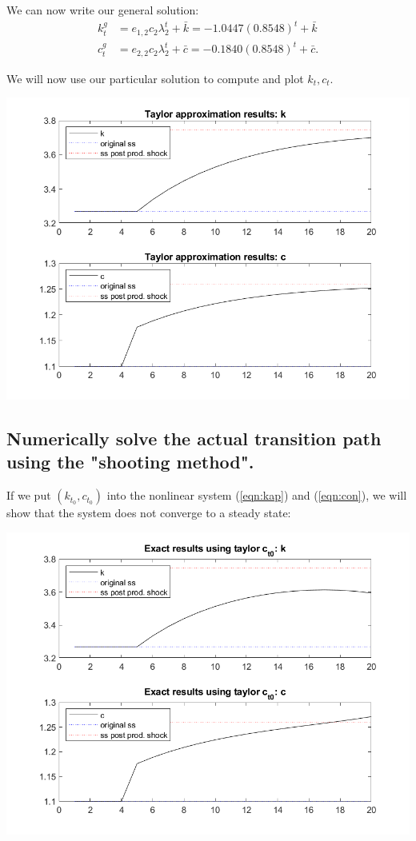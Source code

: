 \documentclass[11pt]{article} %
\begin{document}
We can now write our general solution:
\begin{align*}
k_{t}^{g} &= e_{1,2} c_2 \lambda_{2}^{t} + \bar{k}  = -1.0447 (0.8548)^t + \bar{k}\\
c_{t}^{g} &= e_{2,2} c_2 \lambda_{2}^{t} + \bar{c}  = -0.1840 (0.8548)^t + \bar{c}.
\end{align*}

We will now use our particular solution to compute and plot $k_t,c_t$.

\includegraphics{taylor}

\subsection{Numerically solve the actual transition path using the "shooting method".}

If we put $(k_{t_0},c_{t_0})$ into the nonlinear system  (\ref{eqn:kap}) and (\ref{eqn:con}), we will show that the system does not converge to a steady state:

\includegraphics{exact}
\end{document}
